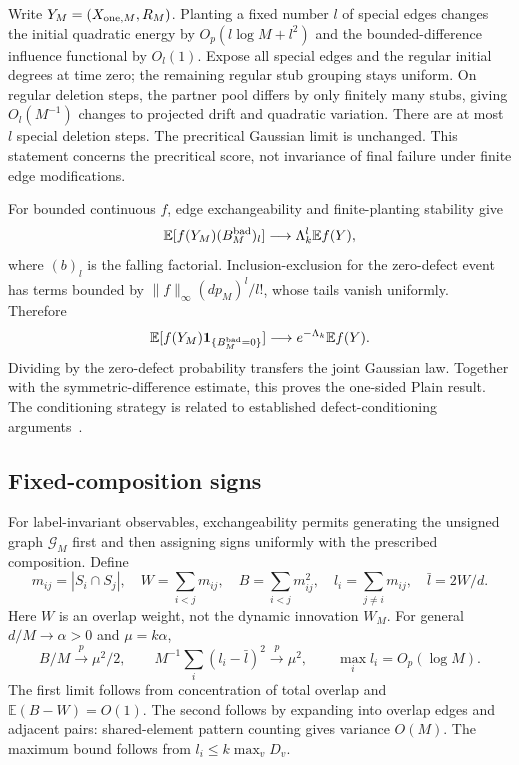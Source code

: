 \documentclass[11pt,a4paper]{article}
\newcommand{\E}{\mathbb E}
\begin{document}
Write $Y_M=(X_{{\rm one},M},R_M)$. Planting a fixed number $l$ of special edges changes the initial quadratic energy by $O_p(l\log M+l^2)$ and the bounded-difference influence functional by $O_l(1)$. Expose all special edges and the regular initial degrees at time zero; the remaining regular stub grouping stays uniform. On regular deletion steps, the partner pool differs by only finitely many stubs, giving $O_l(M^{-1})$ changes to projected drift and quadratic variation. There are at most $l$ special deletion steps. The precritical Gaussian limit is unchanged. This statement concerns the precritical score, not invariance of final failure under finite edge modifications.

For bounded continuous $f$, edge exchangeability and finite-planting stability give
\begin{equation}
\E[f(Y_M)(B_M^{\rm bad})_l]\longrightarrow\Lambda_k^l\E f(Y),
\end{equation}
where $(b)_l$ is the falling factorial. Inclusion-exclusion for the zero-defect event has terms bounded by $\|f\|_\infty(dp_M)^l/l!$, whose tails vanish uniformly. Therefore
\begin{equation}
\E[f(Y_M)\mathbf1_{\{B_M^{\rm bad}=0\}}]\longrightarrow
 e^{-\Lambda_k}\E f(Y).
\end{equation}
Dividing by the zero-defect probability transfers the joint Gaussian law. Together with the symmetric-difference estimate, this proves the one-sided Plain result. The conditioning strategy is related to established defect-conditioning arguments~\cite{jl}.

\subsection{Fixed-composition signs}
For label-invariant observables, exchangeability permits generating the unsigned graph $\mathcal G_M$ first and then assigning signs uniformly with the prescribed composition. Define
\begin{equation}
m_{ij}=|S_i\cap S_j|,\quad W=\sum_{i<j}m_{ij},\quad
B=\sum_{i<j}m_{ij}^2,\quad l_i=\sum_{j\ne i}m_{ij},\quad\bar l=2W/d.
\end{equation}
Here $W$ is an overlap weight, not the dynamic innovation $W_M$. For general $d/M\to\alpha>0$ and $\mu=k\alpha$,
\begin{equation}
B/M\xrightarrow p\mu^2/2,\qquad
M^{-1}\sum_i(l_i-\bar l)^2\xrightarrow p\mu^2,\qquad
\max_i l_i=O_p(\log M).\label{eq:selfavg}
\end{equation}
The first limit follows from concentration of total overlap and $\E(B-W)=O(1)$. The second follows by expanding into overlap edges and adjacent pairs: shared-element pattern counting gives variance $O(M)$. The maximum bound follows from $l_i\le k\max_vD_v$.
\end{document}
